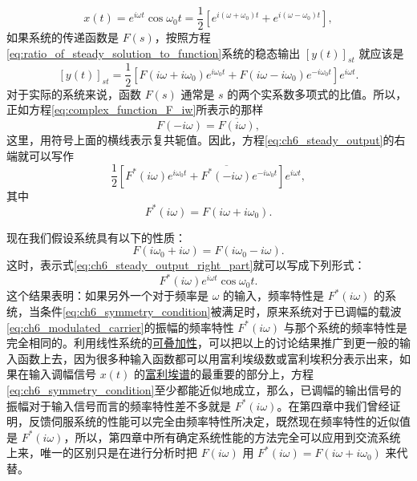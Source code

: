 \begin{equation}\label{eq:ch6_modulated_carrier}
x(t) = e^{i\omega t} \cos \omega_0 t = \frac{1}{2} [e^{i(\omega + \omega_0)t} + e^{i(\omega - \omega_0)t}] ,
\end{equation}
如果系统的传递函数是 $F(s)$，按照方程\eqref{eq:ratio_of_steady_solution_to_function}系统的稳态输出 $[y(t)]_{st}$ 就应该是
\begin{equation}\label{eq:ch6_steady_output}
[y(t)]_{st} = \frac{1}{2} [F(i\omega + i\omega_0)e^{i\omega_0 t} + F(i\omega - i\omega_0)e^{-i\omega_0 t}] e^{i\omega t} .
\end{equation}
对于实际的系统来说，函数 $F(s)$ 通常是 $s$ 的两个实系数多项式的比值。所以，正如方程\eqref{eq:complex_function_F_iw}所表示的那样
\begin{equation}\label{eq:ch6_F_conjugate}
F(-i\omega) = \overline{F(i\omega)} ,
\end{equation}
这里，用符号上面的横线表示复共轭值。因此，方程\eqref{eq:ch6_steady_output}的右端就可以写作
\begin{equation}\label{eq:ch6_steady_output_right_part}
\frac{1}{2} [F^*(i\omega)e^{i\omega_0 t} + \overline{F^*(-i\omega)}e^{-i\omega_0 t}] e^{i\omega t} ,
\end{equation}
其中
\begin{equation}\label{eq:ch6_F_star_def}
F^*(i\omega) = F(i\omega + i\omega_0) .
\end{equation}

现在我们假设系统具有以下的性质：
\begin{equation}\label{eq:ch6_symmetry_condition}
F(i\omega_0 + i\omega) = F(i\omega_0 - i\omega) .
\end{equation}
这时，表示式\eqref{eq:ch6_steady_output_right_part}就可以写成下列形式：
\begin{equation*}
F^*(i\omega)e^{i\omega t}\cos \omega_0 t .
\end{equation*}
这个结果表明：如果另外一个对于频率是 $\omega$ 的输入，频率特性是 $F^*(i\omega)$ 的系统，当条件\eqref{eq:ch6_symmetry_condition}被满足时，原来系统对于已调幅的载波\eqref{eq:ch6_modulated_carrier}的振幅的频率特性 $F^*(i\omega)$ 与那个系统的频率特性是完全相同的。利用线性系统的\underline{可叠加性}，可以把以上的讨论结果推广到更一般的输入函数上去，因为很多种输入函数都可以用富利埃级数或富利埃积分表示出来，如果在输入调幅信号 $x(t)$ 的\underline{富利埃谱}的最重要的部分上，方程\eqref{eq:ch6_symmetry_condition}至少都能近似地成立，那么，已调幅的输出信号的振幅对于输入信号而言的频率特性差不多就是 $F^*(i\omega)$。在第四章中我们曾经证明，反馈伺服系统的性能可以完全由频率特性所决定，既然现在频率特性的近似值是 $F^*(i\omega)$，所以，第四章中所有确定系统性能的方法完全可以应用到交流系统上来，唯一的区别只是在进行分析时把 $F(i\omega)$ 用 $F^*(i\omega) = F(i\omega + i\omega_0)$ 来代替。

